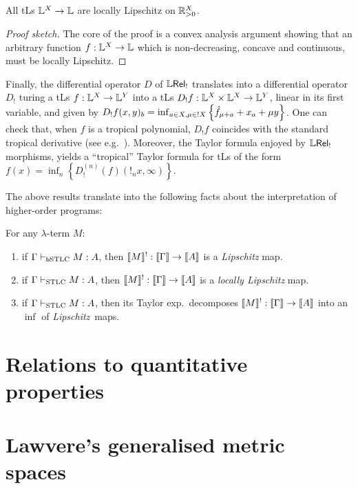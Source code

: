 \documentclass[submission,%
]{eptcs}
\begin{document}
\begin{theorem}\label{thmTLSlocLip}
 All tLs $\mathbb{L}^X\to\mathbb{L}$ are locally Lipschitz on $\mathbb{R}_{>0}^X$.
\end{theorem}
\begin{proof}[Proof sketch]
The core of the proof is a convex analysis argument showing that an arbitrary function $f:\mathbb{L}^X\to\mathbb{L}$ which is non-decreasing, concave and continuous, must be locally Lipschitz. 
\end{proof}

Finally, the differential operator $D$ of $\mathbb{L} \mathsf{Rel}_{!}$ translates into a differential operator $D_{!}$ turing a tLs $f:\mathbb{L}^{X}\to \mathbb{L}^{Y}$ into a tLs $D_{!}f:\mathbb{L}^{X}\times \mathbb{L}^{X}\to \mathbb{L}^{Y}$, linear in its first variable, and given by $D_{!}f(x,y)_{b}=\inf_{a\in X, \mu\in !X}\left\{\hat{f}_{\mu+a}+x_{a}+\mu y\right\}$.
One can check that, when $f$ is a tropical polynomial, $D_{!}f$ coincides with the standard tropical derivative (see e.g.~\cite{Grigoriev2017}).
Moreover, the Taylor formula enjoyed by $\mathbb{L} \mathsf{Rel}_!$ morphisms, yields a ``tropical'' Taylor formula for tLs of the form $f(x)=\inf_{n}\left\{D_{!}^{(n)}(f)(!_{n}x,\infty)\right\}$.


The above results translate into the following facts about the interpretation of higher-order programs:
\begin{corollary}\label{thm:main}
For any $\lambda$-term $M$:
\begin{enumerate}
\item if $\Gamma \vdash_{\mathsf b\mathrm{STLC}} M:A$, then $\llbracket M\rrbracket^!:\llbracket\Gamma\rrbracket \to \llbracket A\rrbracket$ is a \emph{Lipschitz} map.
\item if $\Gamma \vdash_{\mathrm{STLC}}M:A$, then $\llbracket M\rrbracket^!: \llbracket\Gamma\rrbracket \to \llbracket A\rrbracket$ is a \emph{locally Lipschitz} map.
\item  if $\Gamma \vdash_{\mathrm{STLC}}M:A$, then its Taylor exp.\ decomposes $\llbracket M\rrbracket^!: \llbracket\Gamma\rrbracket \to \llbracket A\rrbracket$ into an $\inf$ of \emph{Lipschitz}~maps.
\end{enumerate}
\end{corollary}


\section{Relations to quantitative properties}



\section{Lawvere's generalised metric spaces}
\end{document}
